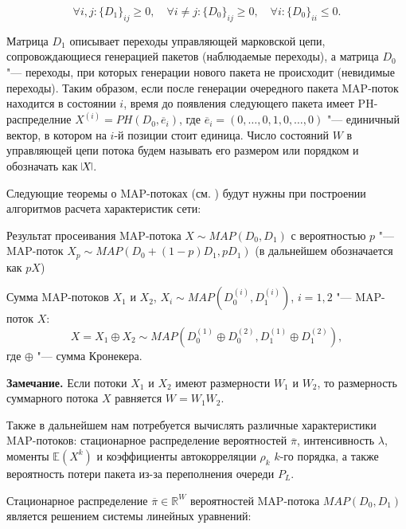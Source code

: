 \begin{equation}
	\label{eq:ch4_map_constraints}
	\forall i, j: \{D_{1}\}_{ij} \geq 0,\quad
	\forall i \neq j: \{D_{0}\}_{ij} \geq 0, \quad
	\forall i: \{D_{0}\}_{ii} \leq 0.
\end{equation}

Матрица $D_1$ описывает переходы управляющей марковской цепи, сопровождающиеся генерацией пакетов (наблюдаемые переходы), а матрица $D_0$ "--- переходы, при которых генерации нового пакета не происходит (невидимые переходы). Таким образом, если после генерации очередного пакета MAP-поток находится в состоянии $i$, время до появления следующего пакета имеет PH-распределние $X^{(i)} = PH(D_0, \overline{e}_i)$, где $\overline{e}_i = (0, \dots, 0, 1, 0, \dots, 0)$ "--- единичный вектор, в котором на $i$-й позиции стоит единица. Число состояний $W$ в управляющей цепи потока будем называть его размером или порядком и обозначать как $\vline X \vline$.


Следующие теоремы о MAP-потоках (см. \cite{VishnevskyDudin2018}) будут нужны при построении алгоритмов расчета характеристик сети:

\begin{thm}\label{th:ch4_sifted_map}
  Результат просеивания MAP-потока $X \sim MAP(D_{0},D_{1})$ с вероятностью $p$ "--- MAP-поток $X_{p} \sim MAP(D_{0}+(1-p)D_{1},pD_{1})$ (в дальнейшем обозначается как $pX$)
\end{thm}

\begin{thm}\label{th:ch4_maps_sum}
  Сумма MAP-потоков $X_{1}$ и $X_{2}$, $X_i \sim MAP(D_{0}^{(i)},D_{1}^{(i)})$, $i=1,2$ "--- MAP-поток $X$:
  $$
    X = X_{1} \oplus X_{2} \sim MAP(D_{0}^{(1)} \oplus D_{0}^{(2)},D_{1}^{(1)} \oplus D_{1}^{(2)}),
  $$
  где $\oplus$ "--- сумма Кронекера.
\end{thm}

\textbf{Замечание.} Если потоки $X_1$ и $X_2$ имеют размерности $W_1$ и $W_2$, то размерность суммарного потока $X$ равняется $W = W_1 W_2$.

Также в дальнейшем нам потребуется вычислять различные характеристики MAP-потоков: стационарное распределение вероятностей $\overline{\pi}$, интенсивность $\lambda$, моменты $\mathbb{E}(X^{k})$ и коэффициенты автокорреляции $\rho_k$ $k$-го порядка, а также вероятность потери пакета из-за переполнения очереди $P_L$.

Стационарное распределение $\overline{\pi} \in \mathbb{R}^W$ вероятностей MAP-потока $MAP(D_0, D_1)$ является решением системы линейных уравнений:


